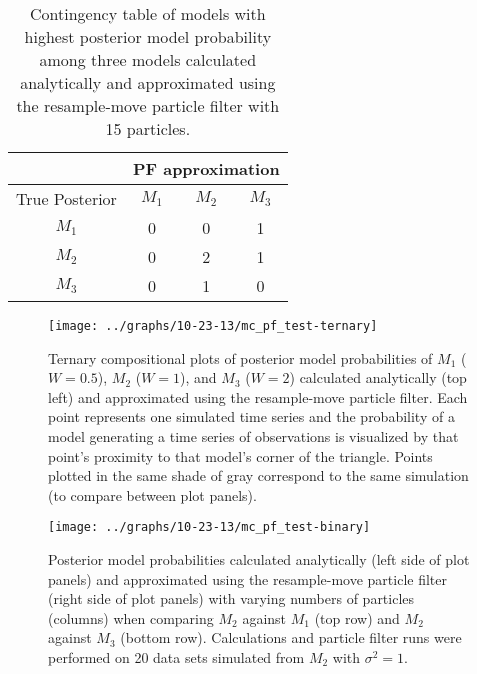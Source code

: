 \documentclass{article}
\begin{document}
\begin{table}
\begin{center}
\caption{Contingency table of models with highest posterior model probability among three models calculated analytically and approximated using the resample-move particle filter with 15 particles.} \label{tab:cont-tab15}
\begin{tabular}{|c|c|c|c|}
\hline
 & \multicolumn{3}{|c|}{PF approximation} \\
 \hline
 True Posterior & $M_1$& $M_2$ & $M_3$ \\
 \hline
$M_1$  &  0  &  0  &  1 \\
\hline
$M_2$  &  0  &  2  &  1 \\
\hline
$M_3$  &  0  &  1  &  0 \\ 
 \hline
\end{tabular}
\end{center}
\end{table}

\begin{figure}
\texttt{[image: ../graphs/10-23-13/mc\_pf\_test-ternary]}
\caption{Ternary compositional plots of posterior model probabilities of $M_1$ ($W = 0.5$), $M_2$ ($W = 1$), and $M_3$ ($W = 2$) calculated analytically (top left) and approximated using the resample-move particle filter. Each point represents one simulated time series and the probability of a model generating a time series of observations is visualized by that point's proximity to that model's corner of the triangle. Points plotted in the same shade of gray correspond to the same simulation (to compare between plot panels).} \label{fig:ternary}
\end{figure}

\begin{figure}
\texttt{[image: ../graphs/10-23-13/mc\_pf\_test-binary]}
\caption{Posterior model probabilities calculated analytically (left side of plot panels) and approximated using the resample-move particle filter (right side of plot panels) with varying numbers of particles (columns) when comparing $M_2$ against $M_1$ (top row) and $M_2$ against $M_3$ (bottom row). Calculations and particle filter runs were performed on 20 data sets simulated from $M_2$ with $\sigma^2 = 1$.} \label{fig:binary}
\end{figure}

\clearpage



\end{document}
